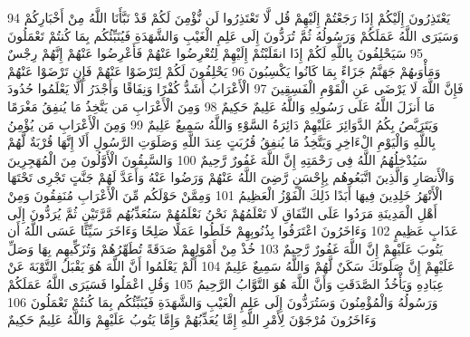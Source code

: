 \documentclass[20pt,a4paper]{article}
\begin{document}
{\tiny\colorbox{cl_aya}{94}} يَعْتَذِرُونَ إِلَيْكُمْ إِذَا رَجَعْتُمْ إِلَيْهِمْ قُل لَّا تَعْتَذِرُوا لَن نُّؤْمِنَ لَكُمْ قَدْ نَبَّأَنَا اللَّهُ مِنْ أَخْبَارِكُمْ وَسَيَرَى اللَّهُ عَمَلَكُمْ وَرَسُولُهُ ثُمَّ تُرَدُّونَ إِلَى عَلِمِ الْغَيْبِ وَالشَّهَدَةِ فَيُنَبِّئُكُم بِمَا كُنتُمْ تَعْمَلُونَ
{\tiny\colorbox{cl_aya}{95}} سَيَحْلِفُونَ بِاللَّهِ لَكُمْ إِذَا انقَلَبْتُمْ إِلَيْهِمْ لِتُعْرِضُوا عَنْهُمْ فَأَعْرِضُوا عَنْهُمْ إِنَّهُمْ رِجْسٌ وَمَأْوَىهُمْ جَهَنَّمُ جَزَاءً بِمَا كَانُوا يَكْسِبُونَ
{\tiny\colorbox{cl_aya}{96}} يَحْلِفُونَ لَكُمْ لِتَرْضَوْا عَنْهُمْ فَإِن تَرْضَوْا عَنْهُمْ فَإِنَّ اللَّهَ لَا يَرْضَى عَنِ الْقَوْمِ الْفَسِقِينَ
{\tiny\colorbox{cl_aya}{97}} الْأَعْرَابُ أَشَدُّ كُفْرًا وَنِفَاقًا وَأَجْدَرُ أَلَّا يَعْلَمُوا حُدُودَ مَا أَنزَلَ اللَّهُ عَلَى رَسُولِهِ وَاللَّهُ عَلِيمٌ حَكِيمٌ
{\tiny\colorbox{cl_aya}{98}} وَمِنَ الْأَعْرَابِ مَن يَتَّخِذُ مَا يُنفِقُ مَغْرَمًا وَيَتَرَبَّصُ بِكُمُ الدَّوَائِرَ عَلَيْهِمْ دَائِرَةُ السَّوْءِ وَاللَّهُ سَمِيعٌ عَلِيمٌ
{\tiny\colorbox{cl_aya}{99}} وَمِنَ الْأَعْرَابِ مَن يُؤْمِنُ بِاللَّهِ وَالْيَوْمِ الْءَاخِرِ وَيَتَّخِذُ مَا يُنفِقُ قُرُبَتٍ عِندَ اللَّهِ وَصَلَوَتِ الرَّسُولِ أَلَا إِنَّهَا قُرْبَةٌ لَّهُمْ سَيُدْخِلُهُمُ اللَّهُ فِى رَحْمَتِهِ إِنَّ اللَّهَ غَفُورٌ رَّحِيمٌ
{\tiny\colorbox{cl_aya}{100}} وَالسَّبِقُونَ الْأَوَّلُونَ مِنَ الْمُهَجِرِينَ وَالْأَنصَارِ وَالَّذِينَ اتَّبَعُوهُم بِإِحْسَنٍ رَّضِىَ اللَّهُ عَنْهُمْ وَرَضُوا عَنْهُ وَأَعَدَّ لَهُمْ جَنَّتٍ تَجْرِى تَحْتَهَا الْأَنْهَرُ خَلِدِينَ فِيهَا أَبَدًا ذَلِكَ الْفَوْزُ الْعَظِيمُ
{\tiny\colorbox{cl_aya}{101}} وَمِمَّنْ حَوْلَكُم مِّنَ الْأَعْرَابِ مُنَفِقُونَ وَمِنْ أَهْلِ الْمَدِينَةِ مَرَدُوا عَلَى النِّفَاقِ لَا تَعْلَمُهُمْ نَحْنُ نَعْلَمُهُمْ سَنُعَذِّبُهُم مَّرَّتَيْنِ ثُمَّ يُرَدُّونَ إِلَى عَذَابٍ عَظِيمٍ
{\tiny\colorbox{cl_aya}{102}} وَءَاخَرُونَ اعْتَرَفُوا بِذُنُوبِهِمْ خَلَطُوا عَمَلًا صَلِحًا وَءَاخَرَ سَيِّئًا عَسَى اللَّهُ أَن يَتُوبَ عَلَيْهِمْ إِنَّ اللَّهَ غَفُورٌ رَّحِيمٌ
{\tiny\colorbox{cl_aya}{103}} خُذْ مِنْ أَمْوَلِهِمْ صَدَقَةً تُطَهِّرُهُمْ وَتُزَكِّيهِم بِهَا وَصَلِّ عَلَيْهِمْ إِنَّ صَلَوتَكَ سَكَنٌ لَّهُمْ وَاللَّهُ سَمِيعٌ عَلِيمٌ
{\tiny\colorbox{cl_aya}{104}} أَلَمْ يَعْلَمُوا أَنَّ اللَّهَ هُوَ يَقْبَلُ التَّوْبَةَ عَنْ عِبَادِهِ وَيَأْخُذُ الصَّدَقَتِ وَأَنَّ اللَّهَ هُوَ التَّوَّابُ الرَّحِيمُ
{\tiny\colorbox{cl_aya}{105}} وَقُلِ اعْمَلُوا فَسَيَرَى اللَّهُ عَمَلَكُمْ وَرَسُولُهُ وَالْمُؤْمِنُونَ وَسَتُرَدُّونَ إِلَى عَلِمِ الْغَيْبِ وَالشَّهَدَةِ فَيُنَبِّئُكُم بِمَا كُنتُمْ تَعْمَلُونَ
{\tiny\colorbox{cl_aya}{106}} وَءَاخَرُونَ مُرْجَوْنَ لِأَمْرِ اللَّهِ إِمَّا يُعَذِّبُهُمْ وَإِمَّا يَتُوبُ عَلَيْهِمْ وَاللَّهُ عَلِيمٌ حَكِيمٌ
\end{document}
